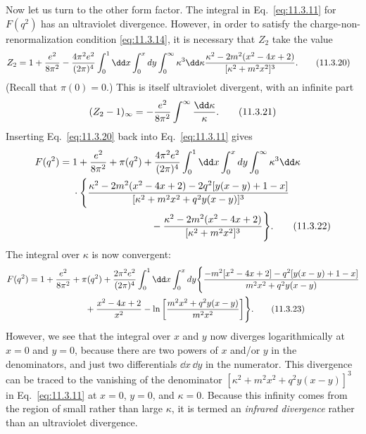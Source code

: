Now let us turn to the other form factor. The integral in Eq.~\eqref{eq:11.3.11} for
$F(q^2)$ has an ultraviolet divergence. However, in order to satisfy the
charge-non-renormalization condition \eqref{eq:11.3.14}, it is necessary that $Z_2$
take the value
\begin{align}
Z_2={}&1+{e^2\over8\pi^2}-{4\pi^2e^2\over(2\pi)^4}
 \int_0^1\dd x\int_0^xdy\int_0^\infty\kappa^3\dd\kappa
 {\kappa^2-2m^2(x^2-4x+2)\over[\kappa^2+m^2x^2]^3}.
\tag{11.3.20}\label{eq:11.3.20}
\end{align}
(Recall that $\pi(0)=0$.) This is itself ultraviolet divergent, with an
infinite part
\begin{equation}
(Z_2-1)_\infty=-{e^2\over8\pi^2}\int^\infty{\dd\kappa\over\kappa}.
\tag{11.3.21}\label{eq:11.3.21}
\end{equation}
Inserting Eq.~\eqref{eq:11.3.20} back into Eq.~\eqref{eq:11.3.11} gives
\begin{align}
F(q^2)={}&1+{e^2\over8\pi^2}+\pi(q^2)
 +{4\pi^2e^2\over(2\pi)^4}\int_0^1\dd x\int_0^xdy
 \int_0^\infty\kappa^3\dd\kappa\notag\\
&\cdot\Biggl\{{\kappa^2-2m^2(x^2-4x+2)
 -2q^2[y(x-y)+1-x]\over[\kappa^2+m^2x^2+q^2y(x-y)]^3}
\notag\\
&\hspace{28mm}-{\kappa^2-2m^2(x^2-4x+2)
 \over[\kappa^2+m^2x^2]^3}\Biggr\}.
\tag{11.3.22}\label{eq:11.3.22}
\end{align}
The integral over $\kappa$ is now convergent:
\begin{align}
F(q^2)={}&1+{e^2\over8\pi^2}+\pi(q^2)
 +{2\pi^2e^2\over(2\pi)^4}\int_0^1\dd x\int_0^xdy
 \Biggl\{{-m^2[x^2-4x+2]-q^2[y(x-y)+1-x]
 \over m^2x^2+q^2y(x-y)}\notag\\
&\hspace{18mm}+{x^2-4x+2\over x^2}
 -\ln\left[{m^2x^2+q^2y(x-y)\over m^2x^2}\right]\Biggr\}.
\tag{11.3.23}\label{eq:11.3.23}
\end{align}
However, we see that the integral over $x$ and $y$ now diverges
logarithmically at $x=0$ and $y=0$, because there are two powers of $x$
and/or $y$ in the denominators, and just two differentials $\dd x\,\dd y$ in the
numerator. This divergence can be traced to the vanishing of the denominator
$[\kappa^2+m^2x^2+q^2y(x-y)]^3$ in Eq.~\eqref{eq:11.3.11} at $x=0$, $y=0$, and
$\kappa=0$. Because this infinity comes from the region of small rather than
large $\kappa$, it is termed an \emph{infrared divergence} rather than an
ultraviolet divergence.

